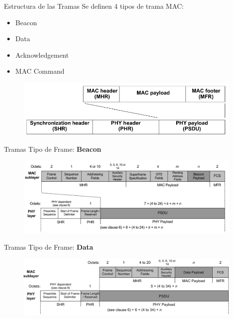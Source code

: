 \documentclass[aspectratio=169]{beamer}
\begin{document}
\begin{frame}{Estructura de las Tramas}
Se definen 4 tipos de trama MAC:
\vspace{5px}
	\begin{itemize}
		\item Beacon
		\vspace{5px}
		\item Data
		\vspace{5px}
		\item Acknowledgement
		\vspace{5px}
		\item MAC Command
		\vspace{5px}
	\end{itemize}
	\begin{figure}[H]
		\includegraphics[width=.8\textwidth]{./imagenes/frameStructure}
	\end{figure}	 	
\end{frame}

\begin{frame}[t]{Tramas}
Tipo de Frame: \textbf{Beacon}
\vspace{10px}
	\begin{figure}[H]
		\includegraphics[width=1\textwidth]{./imagenes/beacon.jpg}
	\end{figure}	  	  	
\end{frame}

\begin{frame}[t]{Tramas}
Tipo de Frame: \textbf{Data}
\vspace{10px}
	\begin{figure}[H]
		\includegraphics[width=1\textwidth]{./imagenes/data.jpg}
	\end{figure}	  	  	
\end{frame}
\end{document}
